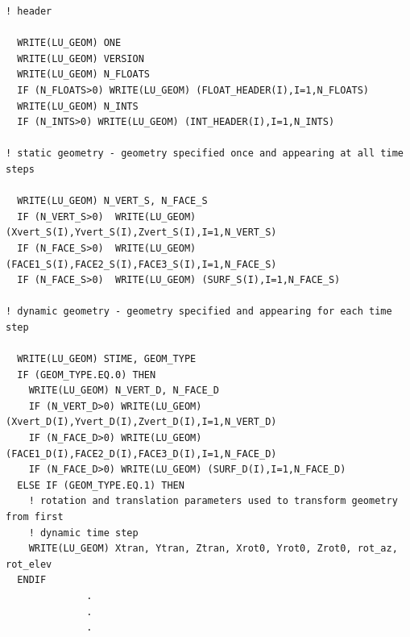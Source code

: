 \documentclass[11pt]{book}
\begin{document}
\footnotesize
\begin{verbatim}
! header

  WRITE(LU_GEOM) ONE
  WRITE(LU_GEOM) VERSION
  WRITE(LU_GEOM) N_FLOATS
  IF (N_FLOATS>0) WRITE(LU_GEOM) (FLOAT_HEADER(I),I=1,N_FLOATS)
  WRITE(LU_GEOM) N_INTS
  IF (N_INTS>0) WRITE(LU_GEOM) (INT_HEADER(I),I=1,N_INTS)

! static geometry - geometry specified once and appearing at all time steps

  WRITE(LU_GEOM) N_VERT_S, N_FACE_S
  IF (N_VERT_S>0)  WRITE(LU_GEOM) (Xvert_S(I),Yvert_S(I),Zvert_S(I),I=1,N_VERT_S)
  IF (N_FACE_S>0)  WRITE(LU_GEOM) (FACE1_S(I),FACE2_S(I),FACE3_S(I),I=1,N_FACE_S)
  IF (N_FACE_S>0)  WRITE(LU_GEOM) (SURF_S(I),I=1,N_FACE_S)

! dynamic geometry - geometry specified and appearing for each time step

  WRITE(LU_GEOM) STIME, GEOM_TYPE
  IF (GEOM_TYPE.EQ.0) THEN
    WRITE(LU_GEOM) N_VERT_D, N_FACE_D
    IF (N_VERT_D>0) WRITE(LU_GEOM) (Xvert_D(I),Yvert_D(I),Zvert_D(I),I=1,N_VERT_D)
    IF (N_FACE_D>0) WRITE(LU_GEOM) (FACE1_D(I),FACE2_D(I),FACE3_D(I),I=1,N_FACE_D)
    IF (N_FACE_D>0) WRITE(LU_GEOM) (SURF_D(I),I=1,N_FACE_D)
  ELSE IF (GEOM_TYPE.EQ.1) THEN
    ! rotation and translation parameters used to transform geometry from first
    ! dynamic time step
    WRITE(LU_GEOM) Xtran, Ytran, Ztran, Xrot0, Yrot0, Zrot0, rot_az, rot_elev
  ENDIF
              .
              .
              .
\end{verbatim}
\normalsize
\end{document}
